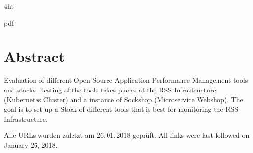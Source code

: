 \documentclass[
               fontsize=12pt, %
               paper=a4,
               twoside, %
               BCOR=3mm, %
               DIV=13,   %
               headinclude=true,
               footinclude=false,
               bibliography=totoc,
               headsepline,
               cleardoublepage=empty,
               parskip=half,
               final   %
               ]{scrbook}
\begin{document}
\iftex4ht
\Configure{$}{\PicMath}{\EndPicMath}{} 

         {pdf}  
         {%
         }  
\fi

%
%


\VerbatimFootnotes %


\Titelblatt

\pagestyle{preamble}
\renewcommand*{\chapterpagestyle}{preamble}

\section*{Abstract}
Evaluation of different Open-Source Application Performance Management tools and stacks.
Testing of the tools takes places at the RSS Infrastructure (Kubernetes Cluster) and a instance of Sockshop (Microservice Webshop). The goal is to set up a Stack of different tools that is best for monitoring the RSS Infrastructure.  
\cleardoublepage




\tableofcontents



%




%
%
\appendix
%


\printbibliography

\ifdeutsch
Alle URLs wurden zuletzt am 26.\,01.\,2018 geprüft.
\else
All links were last followed on January 26, 2018.
\fi

\pagestyle{empty}
\renewcommand*{\chapterpagestyle}{empty}
\Versicherung
\end{document}
